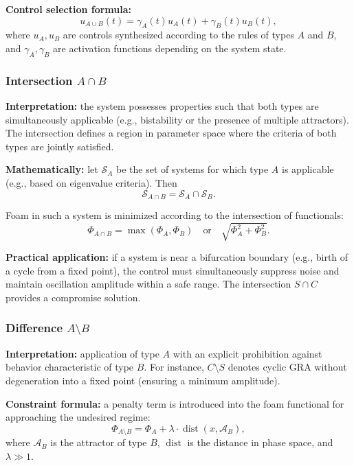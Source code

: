 \documentclass[12pt,a4paper]{article}
\DeclareMathOperator{\dist}{dist}
\begin{document}
\textbf{Control selection formula:}
\begin{equation}
    u_{A \cup B}(t) = \gamma_A(t) u_A(t) + \gamma_B(t) u_B(t),
\end{equation}
where $u_A, u_B$ are controls synthesized according to the rules of types $A$ and $B$, and $\gamma_A, \gamma_B$ are activation functions depending on the system state.

\subsubsection{Intersection $A \cap B$}

\textbf{Interpretation:} the system possesses properties such that both types are simultaneously applicable (e.g., bistability or the presence of multiple attractors). The intersection defines a region in parameter space where the criteria of both types are jointly satisfied.

\textbf{Mathematically:} let $\mathcal{S}_A$ be the set of systems for which type $A$ is applicable (e.g., based on eigenvalue criteria). Then
\begin{equation}
    \mathcal{S}_{A \cap B} = \mathcal{S}_A \cap \mathcal{S}_B.
\end{equation}

Foam in such a system is minimized according to the intersection of functionals:
\begin{equation}
    \Phi_{A \cap B} = \max(\Phi_A, \Phi_B) \quad \text{or} \quad \sqrt{\Phi_A^2 + \Phi_B^2}.
\end{equation}

\textbf{Practical application:} if a system is near a bifurcation boundary (e.g., birth of a cycle from a fixed point), the control must simultaneously suppress noise and maintain oscillation amplitude within a safe range. The intersection $S \cap C$ provides a compromise solution.

\subsubsection{Difference $A \setminus B$}

\textbf{Interpretation:} application of type $A$ with an explicit prohibition against behavior characteristic of type $B$. For instance, $C \setminus S$ denotes cyclic GRA without degeneration into a fixed point (ensuring a minimum amplitude).

\textbf{Constraint formula:} a penalty term is introduced into the foam functional for approaching the undesired regime:
\begin{equation}
    \Phi_{A \setminus B} = \Phi_A + \lambda \cdot \dist(x, \mathcal{A}_B),
\end{equation}
where $\mathcal{A}_B$ is the attractor of type $B$, $\dist$ is the distance in phase space, and $\lambda \gg 1$.
\end{document}
